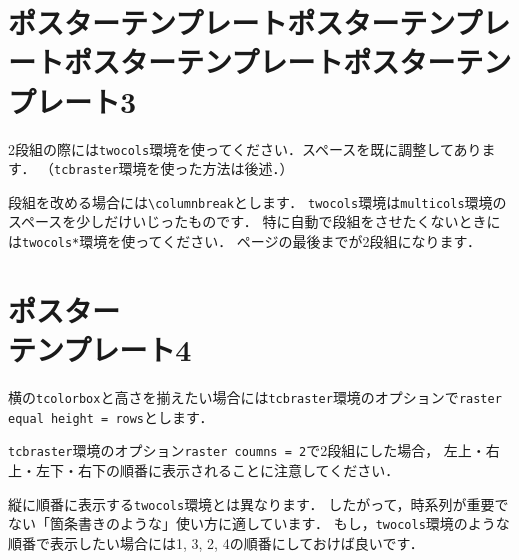 \documentclass[12pt, a4j, dvipdfmx, sffamily]{jsarticle}
\newenvironment{twocols}{\begin{multicols}{2}[\vspace{-4mm}]}{\end{multicols}}
\begin{document}
\newpage
\section*{ポスターテンプレートポスターテンプレートポスターテンプレートポスターテンプレート3}
\begin{twocols}
\begin{tcbraster}[raster columns = 1]
	\begin{tcolorbox}[title = {\texttt{twocols}環境, \texttt{\textbackslash columnbreak}}]
	2段組の際には\texttt{twocols}環境を使ってください．スペースを既に調整してあります．
	（\texttt{tcbraster}環境を使った方法は後述．）
	
	段組を改める場合には\texttt{\textbackslash columnbreak}とします．
	\tcbline
	\texttt{twocols}環境は\texttt{multicols}環境のスペースを少しだけいじったものです．
	\tcbline
	特に自動で段組をさせたくないときには\texttt{twocols*}環境を使ってください．
	ページの最後までが2段組になります．
	\tcbline
	\lipsum[1][1-3]
	\end{tcolorbox}
\columnbreak
	\begin{tcolorbox}[title = lipsum4]
	\lipsum[4]
	\end{tcolorbox}
	\begin{tcolorbox}[title = lipsum5]
	\lipsum[5]
	\end{tcolorbox}
\end{tcbraster}
\end{twocols}

\newpage
\section*{ポスター\\テンプレート4}
\begin{tcbraster}[raster columns = 2, raster equal height = rows]
	\begin{tcolorbox}[title = 1. 横のものと高さを揃える]
	横の\texttt{tcolorbox}と高さを揃えたい場合には\texttt{tcbraster}環境のオプションで\texttt{raster equal height = rows}とします．
	\end{tcolorbox}
	\begin{tcolorbox}[title = 2. lipsum6]
	\lipsum[6]
	\end{tcolorbox}
	\begin{tcolorbox}[title = 3. 順番]
	\texttt{tcbraster}環境のオプション\texttt{raster coumns = 2}で2段組にした場合， 左上・右上・左下・右下の順番に表示されることに注意してください．
	
	縦に順番に表示する\texttt{twocols}環境とは異なります．
	\tcbline
	したがって，時系列が重要でない「箇条書きのような」使い方に適しています．
	\tcbline
	もし，\texttt{twocols}環境のような順番で表示したい場合には1, 3, 2, 4の順番にしておけば良いです．
	\end{tcolorbox}
	\begin{tcolorbox}[title = 4. lipsum7-1]
	\lipsum[7][1]
	\end{tcolorbox}
\end{tcbraster}
\end{document}
